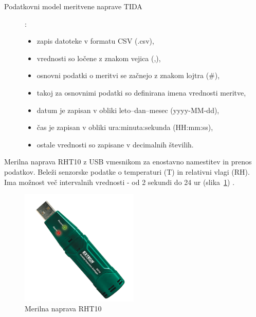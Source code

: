 \documentclass[a4paper, 12pt]{book}
\begin{document}
\begin{description}
\item[Podatkovni model meritvene naprave TIDA]:
\begin{itemize}
\item  zapis datoteke v formatu CSV (.csv),
\item  vrednosti so ločene z znakom vejica (,),
\item  osnovni podatki o meritvi se začnejo z znakom lojtra (\#),
\item  takoj za osnovnimi podatki so definirana imena vrednosti meritve,
\item  datum je zapisan v obliki leto--dan--mesec (yyyy-MM-dd),
\item  čas je zapisan v obliki ura:minuta:sekunda (HH:mm:ss),
\item  ostale vrednosti so zapisane v decimalnih številih.
\end{itemize}
\end{description}

\clearpage

Merilna naprava RHT10 z USB vmesnikom za enostavno namestitev in prenos podatkov. Beleži senzorske podatke o temperaturi (T) in relativni vlagi (RH). 
Ima možnost več intervalnih vrednosti - od 2 sekundi do 24 ur (slika~\ref{merilna-naprava-rht10}) \cite{rht10-dialogger}.

\begin{figure}[h]
\begin{center}
\includegraphics[width=0.5\textwidth]{slike/merilna-naprava-rht10.png}
\end{center}
\caption{Merilna naprava RHT10}
\label{merilna-naprava-rht10}
\end{figure}
\end{document}
